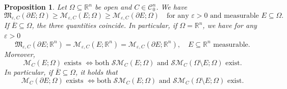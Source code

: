 \documentclass[pdflatex,sn-mathphys-num]{sn-jnl}
\theoremstyle{plain}
\newtheorem{proposition}[theorem]{Proposition}
\theoremstyle{definition}
\begin{document}
\begin{proposition}\label{simonka}
Let $\Omega\subseteq\mathbb{R}^n$ be open and $C\in\mathcal{C}^n_0$. We have
\[
\mathfrak{M}_{\varepsilon, C}(\partial E; \Omega)\geq\mathscr{M}_{\varepsilon, C}(E; \Omega)\geq\mathcal{M}_{\varepsilon, C}(\partial E; \Omega) \quad \text{for any $\varepsilon>0$ and measurable $E\subseteq\Omega$.}
\]
If $\overline{E}\subseteq\Omega$, the three quantities coincide. In particular, if $\Omega=\mathbb{R}^n$, we have for any $\varepsilon>0$
\[
\mathfrak{M}_{\varepsilon, C}(\partial E; \mathbb{R}^n)=\mathscr{M}_{\varepsilon, C}(E; \mathbb{R}^n)=\mathcal{M}_{\varepsilon, C}(\partial E; \mathbb{R}^n), \quad \text{$E\subseteq\mathbb{R}^n$ measurable.}
\]
Moreover,
\[
\mathscr{M}_{C}(E; \Omega) \text{ exists } \iff \text{both $\mathcal{SM}_C(E; \Omega)$ and $\mathcal{SM}_C(\Omega\setminus E; \Omega)$ exist.}
\]
In particular, if $\overline{E}\subseteq\Omega$, it holds that
\[
\mathcal{M}_{C}(\partial E; \Omega) \text{ exists } \iff \text{both $\mathcal{SM}_C(E; \Omega)$ and $\mathcal{SM}_C(\Omega\setminus E; \Omega)$ exist.}
\]
\end{proposition}
\end{document}
